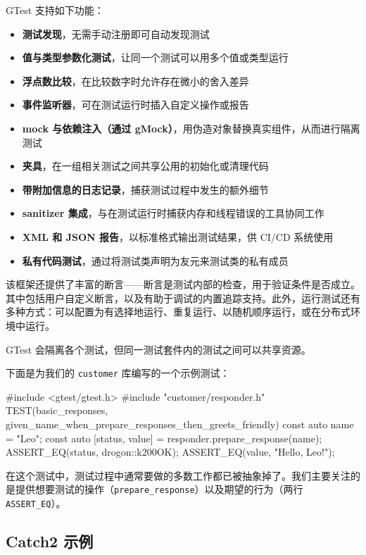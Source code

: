 \label{idx:816}
GTest 支持如下功能：

\begin{itemize}
\item \textbf{测试发现}，无需手动注册即可自动发现测试
\item \textbf{值与类型参数化测试}，让同一个测试可以用多个值或类型运行
\item \textbf{浮点数比较}，在比较数字时允许存在微小的舍入差异
\item \textbf{事件监听器}，可在测试运行时插入自定义操作或报告
\item \textbf{mock 与依赖注入（通过 gMock）}，用伪造对象替换真实组件，从而进行隔离测试
\item \textbf{夹具}，在一组相关测试之间共享公用的初始化或清理代码
\item \textbf{带附加信息的日志记录}，捕获测试过程中发生的额外细节
\item \textbf{sanitizer 集成}，与在测试运行时捕获内存和线程错误的工具协同工作
\item \textbf{XML 和 JSON 报告}，以标准格式输出测试结果，供 CI/CD 系统使用
\item \textbf{私有代码测试}，通过将测试类声明为友元来测试类的私有成员
\end{itemize}

该框架还提供了丰富的断言——断言是测试内部的检查，用于验证条件是否成立。其中包括用户自定义断言，以及有助于调试的内置追踪支持。此外，运行测试还有多种方式：可以配置为有选择地运行、重复运行、以随机顺序运行，或在分布式环境中运行。

GTest 会隔离各个测试，但同一测试套件内的测试之间可以共享资源。

下面是为我们的 \texttt{customer} 库编写的一个示例测试：

\begin{codebox}[cpp]
#include <gtest/gtest.h>
#include "customer/responder.h"
TEST(basic_responses, given_name_when_prepare_responses_then_greets_friendly) {
  const auto name = "Leo";
  const auto [status, value] = responder{}.prepare_response(name);
  ASSERT_EQ(status, drogon::k200OK);
  ASSERT_EQ(value, "Hello, Leo!");
}
\end{codebox}

\label{idx:817}
在这个测试中，测试过程中通常要做的多数工作都已被抽象掉了。我们主要关注的是提供想要测试的操作（\texttt{prepare\_\allowbreak{}response}）以及期望的行为（两行 \texttt{ASSERT\_\allowbreak{}EQ}）。

\subsection{Catch2 示例}

